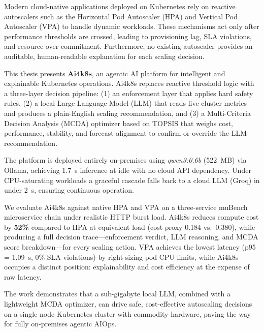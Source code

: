Modern cloud-native applications deployed on Kubernetes rely on reactive autoscalers
such as the Horizontal Pod Autoscaler (HPA) and Vertical Pod Autoscaler (VPA) to
handle dynamic workloads. These mechanisms act only after performance thresholds are
crossed, leading to provisioning lag, SLA violations, and resource over-commitment.
Furthermore, no existing autoscaler provides an auditable, human-readable explanation
for each scaling decision.

This thesis presents \textbf{Ai4k8s}, an agentic AI platform for intelligent and
explainable Kubernetes operations. Ai4k8s replaces reactive threshold logic with
a three-layer decision pipeline:
(1) an enforcement layer that applies hard safety rules, (2) a local Large Language
Model (LLM) that reads live cluster metrics and produces a plain-English scaling
recommendation, and (3) a Multi-Criteria Decision Analysis (MCDA) optimizer based
on TOPSIS that weighs cost, performance, stability, and forecast alignment to confirm
or override the LLM recommendation.

The platform is deployed entirely on-premises using \textit{qwen3:0.6b} (522~MB)
via Ollama, achieving 1.7~s inference at idle with no cloud API dependency. Under
CPU-saturating workloads a graceful cascade falls back to a cloud LLM (Groq) in
under 2~s, ensuring continuous operation.

We evaluate Ai4k8s against native HPA and VPA on a three-service muBench
microservice chain under realistic HTTP burst load. Ai4k8s reduces compute cost
by \textbf{52\%} compared to HPA at equivalent load (cost proxy 0.184 vs.\ 0.380),
while producing a full decision trace—enforcement verdict, LLM reasoning, and MCDA
score breakdown—for every scaling action. VPA achieves the lowest latency (p95
= 1.09~s, 0\% SLA violations) by right-sizing pod CPU limits, while Ai4k8s
occupies a distinct position: explainability and cost efficiency at the expense
of raw latency.

The work demonstrates that a sub-gigabyte local LLM, combined with a lightweight
MCDA optimizer, can drive safe, cost-effective autoscaling decisions on a single-node
Kubernetes cluster with commodity hardware, paving the way for fully on-premises
agentic AIOps.